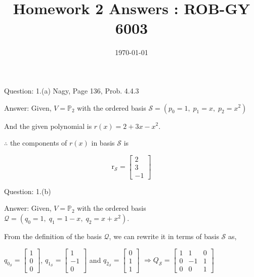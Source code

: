 \documentclass[a4paper]{article}
\title{Homework 2 Answers : ROB-GY 6003}
\author{\myName}
\date{\today}
\newcommand{\myName}{\textbf{Shantanu Ghodgaonkar}\\\textit{Univ ID}: N11344563\\\textit{Net ID}: sng8399\\\textit{Ph.No.}: +1 (929) 922-0614}
\begin{document}
	
	
	\begin{qalist}			
		\item[Question: 1.(a)] \setcounter{equation}{0} Nagy, Page 136, Prob. 4.4.3
		\item[Answer:] Given, $V = {\mathbb{P}}_{2}$ with the ordered basis $\mathcal{S} = \left( {p}_{0} = 1,\;{p}_{1} = x,\;{p}_{2} = {x}^{2}\right)$ 
		
		And the given polynomial is $r(x) = 2 + 3x - {x}^{2}$.
		
		
		$\therefore$ the components of $r(x)$ in basis $\mathcal{S}$ is 
		
		\begin{equation}
			{\text{r}}_{\mathcal{S}} = \begin{bmatrix} 2 \\ 3 \\ -1 \end{bmatrix}
		\end{equation}
		
		\item[Question: 1.(b)] \setcounter{equation}{0} %
		\item[Answer:] Given, $V = {\mathbb{P}}_{2}$ with the ordered basis $\mathcal{Q} = \left( {q}_{0} = 1,\;{q}_{1} = 1 - x,\;{q}_{2} = x + {x}^{2}\right)$. 
		
		From the definition of the basis $\mathcal{Q}$, we can rewrite it in terms of basis $\mathcal{S}$ as, 
		
		${q}_{0_{\mathcal{S}}} = \begin{bmatrix}1 \\ 0 \\ 0\end{bmatrix}$, ${q}_{1_{\mathcal{S}}} = \begin{bmatrix}1 \\ -1 \\ 0\end{bmatrix}$ and ${q}_{2_{\mathcal{S}}} = \begin{bmatrix}0 \\ 1 \\ 1\end{bmatrix}$ $\Rightarrow {Q}_{\mathcal{S}} = \begin{bmatrix}1 & 1 & 0 \\ 0 & -1 & 1 \\ 0 & 0 & 1\end{bmatrix}$
		

\end{qalist}
\end{document}
